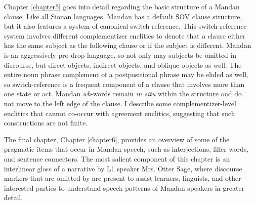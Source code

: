 Chapter \ref{chapter5} goes into detail regarding the basic structure of a Mandan clause. Like all Siouan languages, Mandan has a default SOV clause structure, but it also features a system of canonical switch-reference. This switch-reference system involves different complementizer enclitics to denote that a clause either has the same subject as the following clause or if the subject is different. Mandan is an aggressively pro-drop language, so not only may subjects be omitted in discourse, but direct objects, indirect objects, and oblique objects as well. The entire noun phrase complement of a postpositional phrase may be elided as well, so switch-reference is a frequent component of a clause that involves more than one state or act. Mandan \textit{wh}-words remain \textit{in situ} within the structure and do not move to the left edge of the clause. I describe some complementizer-level enclitics that cannot co-occur with agreement enclitics, suggesting that such constructions are not finite.

The final chapter, Chapter \ref{chapter6}, provides an overview of some of the pragmatic items that occur in Mandan speech, such as interjections, filler words, and sentence connectors. The most salient component of this chapter is an interlinear gloss of a narrative by L1 speaker Mrs. Otter Sage, where discourse markers that are omitted by \citet{hollow1973a} are present to assist learners, linguists, and other interested parties to understand speech patterns of Mandan speakers in greater detail.
